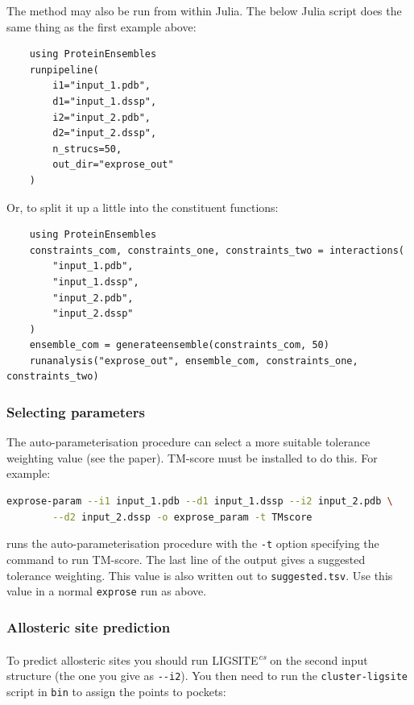 The method may also be run from within Julia. The below Julia script does the same thing as the first example above:

\begin{lstlisting}
    using ProteinEnsembles
    runpipeline(
        i1="input_1.pdb",
        d1="input_1.dssp",
        i2="input_2.pdb",
        d2="input_2.dssp",
        n_strucs=50,
        out_dir="exprose_out"
    )
\end{lstlisting}

Or, to split it up a little into the constituent functions:

\begin{lstlisting}
    using ProteinEnsembles
    constraints_com, constraints_one, constraints_two = interactions(
        "input_1.pdb",
        "input_1.dssp",
        "input_2.pdb",
        "input_2.dssp"
    )
    ensemble_com = generateensemble(constraints_com, 50)
    runanalysis("exprose_out", ensemble_com, constraints_one, constraints_two)
\end{lstlisting}


\subsubsection{Selecting parameters}

The auto-parameterisation procedure can select a more suitable tolerance weighting value (see the paper). TM-score must be installed to do this. For example:

\begin{lstlisting}[language=bash]
    exprose-param --i1 input_1.pdb --d1 input_1.dssp --i2 input_2.pdb \
        --d2 input_2.dssp -o exprose_param -t TMscore
\end{lstlisting}

runs the auto-parameterisation procedure with the \verb|-t| option specifying the command to run TM-score. The last line of the output gives a suggested tolerance weighting. This value is also written out to \verb|suggested.tsv|. Use this value in a normal \verb|exprose| run as above.


\subsubsection{Allosteric site prediction}

To predict allosteric sites you should run LIGSITE\textsuperscript{\it cs} on the second input structure (the one you give as \verb|--i2|). You then need to run the \verb|cluster-ligsite| script in \verb|bin| to assign the points to pockets:

